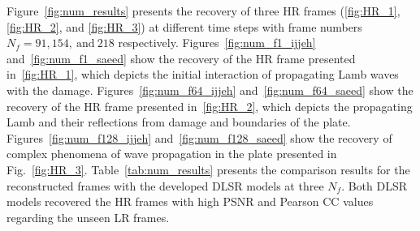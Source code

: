 Figure~\ref{fig:num_results} presents the recovery of three HR frames (\ref{fig:HR_1}, \ref{fig:HR_2}, and \ref{fig:HR_3}) at different time steps with frame numbers \(N_f=91, 154,\ \text{and}\ 218\) respectively.
Figures~\ref{fig:num_f1_ijjeh} and~\ref{fig:num_f1_saeed} show the recovery of the HR frame presented in~\ref{fig:HR_1}, which depicts the initial interaction of propagating Lamb waves with the damage.
Figures~\ref{fig:num_f64_ijjeh} and~\ref{fig:num_f64_saeed} show the recovery of the HR frame presented in~\ref{fig:HR_2}, which depicts the propagating Lamb and their reflections from damage and boundaries of the plate.
Figures~\ref{fig:num_f128_ijjeh} and~\ref{fig:num_f128_saeed} show the recovery of complex phenomena of wave propagation in the plate presented in Fig.~\ref{fig:HR_3}.
Table~\ref{tab:num_results} presents the comparison results for the reconstructed frames with the developed DLSR models at three $N_f$.
Both DLSR models recovered the HR frames with high PSNR and Pearson CC values regarding the unseen LR frames.
